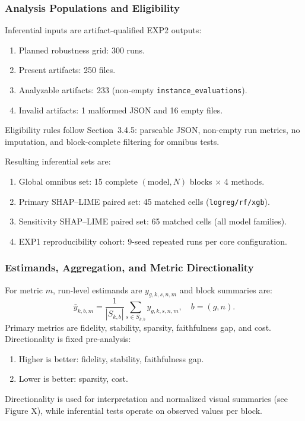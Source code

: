 \documentclass[twoside,11pt]{article}
\begin{document}
\subsubsection{Analysis Populations and Eligibility}
Inferential inputs are artifact-qualified EXP2 outputs:
\begin{enumerate}[leftmargin=*]
    \item Planned robustness grid: 300 runs.
    \item Present artifacts: 250 files.
    \item Analyzable artifacts: 233 (non-empty \texttt{instance\_evaluations}).
    \item Invalid artifacts: 1 malformed JSON and 16 empty files.
\end{enumerate}
Eligibility rules follow Section~3.4.5: parseable JSON, non-empty run metrics,
no imputation, and block-complete filtering for omnibus tests.

Resulting inferential sets are:
\begin{enumerate}[leftmargin=*]
    \item Global omnibus set: 15 complete $(\text{model},N)$ blocks $\times$ 4 methods.
    \item Primary SHAP--LIME paired set: 45 matched cells (\texttt{logreg/rf/xgb}).
    \item Sensitivity SHAP--LIME paired set: 65 matched cells (all model families).
    \item EXP1 reproducibility cohort: 9-seed repeated runs per core configuration.
\end{enumerate}

\subsubsection{Estimands, Aggregation, and Metric Directionality}
For metric $m$, run-level estimands are $y_{g,k,s,n,m}$ and block summaries are:
\[
\bar{y}_{k,b,m}=\frac{1}{|S_{k,b}|}\sum_{s\in S_{k,b}}y_{g,k,s,n,m},\quad b=(g,n).
\]
Primary metrics are fidelity, stability, sparsity, faithfulness gap, and cost.
Directionality is fixed pre-analysis:
\begin{enumerate}[leftmargin=*]
    \item Higher is better: fidelity, stability, faithfulness gap.
    \item Lower is better: sparsity, cost.
\end{enumerate}
Directionality is used for interpretation and normalized visual summaries (see
Figure X), while inferential tests operate on observed values per block.
\end{document}

